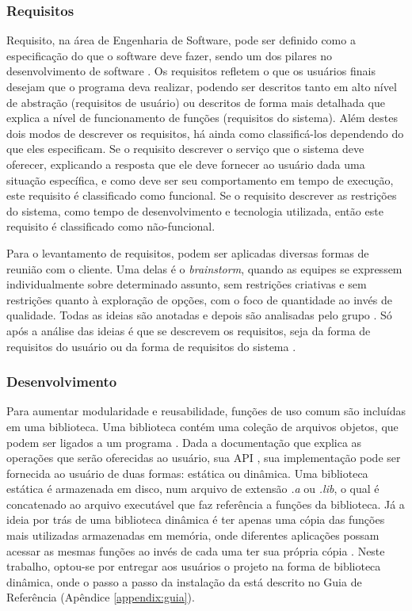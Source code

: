 \subsubsection{Requisitos}

Requisito, na área de Engenharia de Software, pode ser definido como a especificação do que o software deve fazer, sendo um dos pilares no desenvolvimento de software \cite{sommerville}. Os requisitos refletem o que os usuários finais desejam que o programa deva realizar, podendo ser descritos tanto em alto nível de abstração (requisitos de usuário) ou descritos de forma mais detalhada que explica a nível de funcionamento de funções (requisitos do sistema). Além destes dois modos de descrever os requisitos, há ainda como classificá-los dependendo do que eles especificam. Se o requisito descrever o serviço que o sistema deve oferecer, explicando a resposta que ele deve fornecer ao usuário dada uma situação específica, e como deve ser seu comportamento em tempo de execução, este requisito é classificado como funcional. Se o requisito descrever as restrições do sistema, como tempo de desenvolvimento e tecnologia utilizada, então este requisito é classificado como não-funcional.

Para o levantamento de requisitos, podem ser aplicadas diversas formas de reunião com o cliente. Uma delas é o \emph{brainstorm}, quando as equipes se expressem individualmente sobre determinado assunto, sem restrições criativas e sem restrições quanto à exploração de opções, com o foco de quantidade ao invés de qualidade. Todas as ideias são anotadas e depois são analisadas pelo grupo \cite{brainstorm}. Só após a análise das ideias é que se descrevem os requisitos, seja da forma de requisitos do usuário ou da forma de requisitos do sistema \cite{sommerville}.

\subsubsection{Desenvolvimento}

Para aumentar modularidade e reusabilidade, funções de uso comum são incluídas em uma biblioteca. Uma biblioteca contém uma coleção de arquivos objetos, que podem ser ligados a um programa \cite{biblioteca}. Dada a documentação que explica as operações que serão oferecidas ao usuário, sua \acrfull{API} \cite{algoritmos}, sua implementação pode ser fornecida ao usuário de duas formas: estática ou dinâmica. 
Uma biblioteca estática é armazenada em disco, num arquivo de extensão \emph{.a} ou \emph{.lib}, o qual é concatenado ao arquivo executável que faz referência a funções da biblioteca. Já a ideia por trás de uma biblioteca dinâmica é ter apenas uma cópia das funções mais utilizadas armazenadas em memória, onde diferentes aplicações possam acessar as mesmas funções ao invés de cada uma ter sua própria cópia \cite{biblioteca}. Neste trabalho, optou-se por entregar aos usuários o projeto na forma de biblioteca dinâmica, onde o passo a passo da instalação da \playAPC{} está descrito no Guia de Referência (Apêndice \ref{appendix:guia}).

